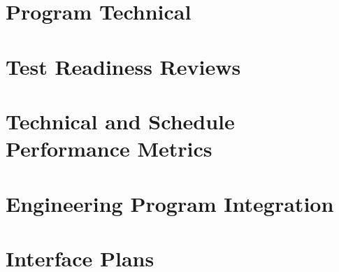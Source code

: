\section{Program Technical}

\section{Test Readiness Reviews}

\section{Technical and Schedule Performance Metrics}

\section{Engineering Program Integration}

\section{Interface Plans}
